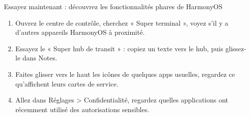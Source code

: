 \begin{tcbpractice}{Essayez maintenant : découvrez les fonctionnalités phares de HarmonyOS}
\begin{enumerate}
  \item Ouvrez le centre de contrôle, cherchez « Super terminal », voyez s'il y a d'autres appareils HarmonyOS à proximité.
  \item Essayez le « Super hub de transit » : copiez un texte vers le hub, puis glissez-le dans Notes.
  \item Faites glisser vers le haut les icônes de quelques apps usuelles, regardez ce qu'affichent leurs cartes de service.
  \item Allez dans Réglages > Confidentialité, regardez quelles applications ont récemment utilisé des autorisations sensibles.
\end{enumerate}

\end{tcbpractice}
